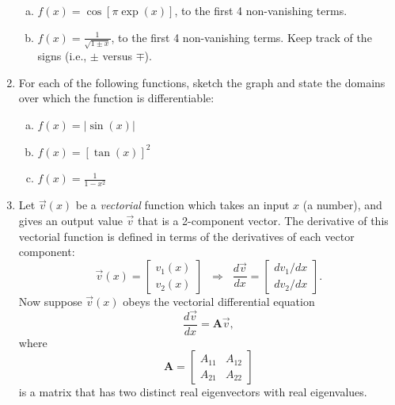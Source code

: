 \documentclass[10pt,a4paper]{article}
\begin{document}
\begin{enumerate}
\begin{enumerate}[(a)]
  \item
    $f(x) = \cos\left[\pi\exp(x)\right]$, to the first 4 non-vanishing
    terms.

  \item
    $\displaystyle f(x) = \frac{1}{\sqrt{1 \pm x}}$, to the first 4
    non-vanishing terms. Keep track of the signs (i.e., $\pm$ versus
    $\mp$).
  \end{enumerate}

\item
  For each of the following functions, sketch the graph and state the
  domains over which the function is differentiable:

  \begin{enumerate}[(a)]
  \item
    $f(x) = |\sin(x)|$

  \item
    $f(x) = \left[\tan(x)\right]^2$

  \item
    $\displaystyle f(x) = \frac{1}{1-x^2}$
  \end{enumerate}

\item
  Let $\vec{v}(x)$ be a \emph{vectorial} function which takes an input
  $x$ (a number), and gives an output value $\vec{v}$ that is a
  2-component vector. The derivative of this vectorial function is
  defined in terms of the derivatives of each vector component:
  \begin{equation}
    \vec{v}(x) = \begin{bmatrix}v_1(x) \\ v_2(x)\end{bmatrix}
    \;\; \Rightarrow \;\; \frac{d\vec{v}}{dx} = \begin{bmatrix}dv_1/dx \\
      dv_2/dx\end{bmatrix}.
  \end{equation}
  Now suppose $\vec{v}(x)$ obeys the vectorial differential equation
  \begin{equation}
    \frac{d\vec{v}}{dx} = \mathbf{A} \vec{v},
  \end{equation}
  where
  \begin{equation}
    \mathbf{A} = \begin{bmatrix}A_{11} & A_{12} \\ A_{21} & A_{22}\end{bmatrix}
  \end{equation}
  is a matrix that has two distinct real eigenvectors with real
  eigenvalues.


\end{enumerate}
\end{document}
